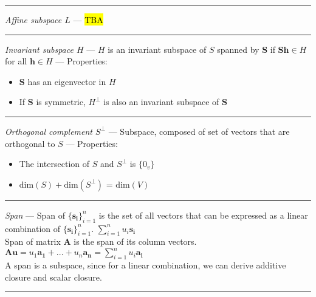 {\color{lightgray}\hrule height 0.001mm}

\emph{Affine subspace $L$} --- 
\hl{TBA}

{\color{lightgray}\hrule height 0.001mm}

\emph{Invariant subspace $H$} --- $H$ is an invariant subspace of $S$ spanned by $\boldsymbol{S}$ if $\boldsymbol{S}\boldsymbol{h} \in H$ for all $\boldsymbol{h} \in H$ --- Properties:
\begin{itemize}
    \item $\boldsymbol{S}$ has an eigenvector in $H$
    \item If $\boldsymbol{S}$ is symmetric, $H^\bot$ is also an invariant subspace of $\boldsymbol{S}$
\end{itemize}

{\color{lightgray}\hrule height 0.001mm}

\emph{Orthogonal complement $S^{\bot}$} --- Subspace, composed of set of vectors that are orthogonal to $S$ --- Properties:
\begin{multicols}{2}
\begin{itemize}
    \item The intersection of $S$ and $S^{\bot}$ is $\{0_v\}$
    \item $\textrm{dim}(S) + \textrm{dim}(S^{\bot})$ = $\textrm{dim}(V)$
\end{itemize}
\end{multicols}

{\color{lightgray}\hrule height 0.001mm}

\emph{Span} --- Span of $\{\boldsymbol{s_i}\}_{i=1}^n$ is the set of all vectors that can be expressed as a linear combination of $\{\boldsymbol{s_i}\}_{i=1}^n$.
$\sum_{i=1}^n u_i \boldsymbol{s_i}$
\\
Span of matrix $\boldsymbol{A}$ is the span of its column vectors.
$\boldsymbol{A}\boldsymbol{u} = u_1 \boldsymbol{a_1} + ... + u_n \boldsymbol{a_n} = \sum_{i=1}^n u_i \boldsymbol{a_i}$
\\
A span is a subspace, since for a linear combination, we can derive additive closure and scalar closure.

{\color{lightgray}\hrule height 0.001mm}

